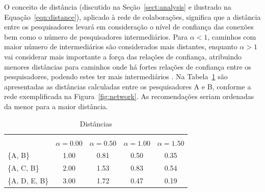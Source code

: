 \documentclass[12pt]{article}
\begin{document}
O conceito de distância (discutido na Seção~\ref{sect:analysis} e ilustrado na Equação~\ref{eqn:distance}), aplicado à rede de colaborações, significa que a distância entre os pesquisadores levará em consideração o nível de confiança das conexões bem como o número de pesquisadores intermediários. Para $\alpha < 1$, caminhos com maior número de intermediários são considerados mais distantes, enquanto $\alpha > 1$ vai considerar mais importante a força das relações de confiança, atribuindo menores distâncias para caminhos onde há fortes relações de confiança entre os pesquisadores, podendo estes ter mais intermediários \cite{opsahl2010node}. Na Tabela~\ref{tab:distances} são apresentadas as distâncias calculadas entre os pesquisadores A e B, conforme a rede exemplificada na Figura~\ref{fig:network}. As recomendações seriam ordenadas da menor para a maior distância.

{\tiny
  \begin{table}[ht]
    \caption{Distâncias}
    \label{tab:distances}
    \centering
    \begin{tabular}{|lcccc|}
      \hline
      \rowcolor[HTML]{343434} 
      \multicolumn{1}{|c}{\cellcolor[HTML]{343434}{\color[HTML]{FFFFFF} }}                       & \multicolumn{4}{c|}{\cellcolor[HTML]{343434}{\color[HTML]{FFFFFF} $ d^{w\alpha}(i, j) $}}                                               \\
      \rowcolor[HTML]{656565} 
      \multicolumn{1}{|c}{\multirow{-2}{*}{\cellcolor[HTML]{343434}{\color[HTML]{FFFFFF} Caminho}}} & {\color[HTML]{EFEFEF} $ \alpha = 0.00 $} & {\color[HTML]{EFEFEF} $ \alpha=0.50 $} & {\color[HTML]{EFEFEF} $ \alpha=1.00 $} & {\color[HTML]{EFEFEF} $ \alpha=1.50 $} \\ \cline{1-1}
      \multicolumn{1}{|l|}{\{A, B\}}                                                             & 1.00                        & 0.81                        & 0.50                        & 0.35                        \\
      \multicolumn{1}{|l|}{\{A, C, B\}}                                                          & 2.00                        & 1.53                        & 0.83                        & 0.54                        \\
      \multicolumn{1}{|l|}{\{A, D, E, B\}}                                                       & 3.00                        & 1.72                        & 0.47                        & 0.19                        \\ \hline
    \end{tabular}
  \end{table}  
  }
\end{document}
